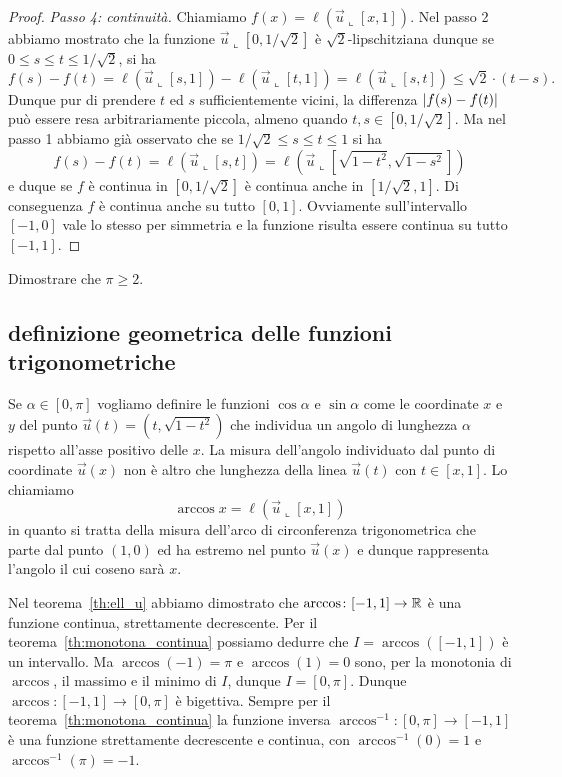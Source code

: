 \begin{proof}
  \emph{Passo 4: continuità.}
  Chiamiamo $f(x)= \ell(\vec u \llcorner[x,1])$.
  Nel passo 2 abbiamo mostrato che la funzione $\vec u \llcorner [0,1/\sqrt 2]$ 
  è $\sqrt 2$-lipschitziana dunque se $0\le s \le t \le 1/\sqrt 2$, si ha 
  \[
  f(s)-f(t) = \ell(\vec u\llcorner [s,1]) - \ell(\vec u\llcorner[t,1])
  = \ell(\vec u \llcorner[s,t]) 
  \le \sqrt 2\cdot (t-s).
  \]
  Dunque pur di prendere $t$ ed $s$ sufficientemente vicini, 
  la differenza ${\left|f(s)-f(t)\right|}$ può essere resa arbitrariamente piccola,
  almeno quando $t,s \in [0,1/\sqrt 2]$.
  Ma nel passo 1 abbiamo già osservato che se $1/\sqrt 2 \le s \le t \le 1$ 
  si ha 
  \[
  f(s)-f(t) 
  = \ell(\vec u \llcorner [s,t])
  = \ell(\vec u \llcorner [\sqrt{1-t^2},\sqrt{1-s^2}])  
  \]
  e duque se $f$ è continua in $[0,1/\sqrt 2]$ è continua 
  anche in $[1/\sqrt 2, 1]$. 
  Di conseguenza $f$ è continua anche su tutto $[0,1]$.
  Ovviamente sull'intervallo $[-1,0]$ vale lo stesso per simmetria
  e la funzione risulta essere continua su tutto $[-1,1]$.
\end{proof}

\begin{exercise}
Dimostrare che $\pi\ge 2$.
\end{exercise}

\subsection{definizione geometrica delle funzioni trigonometriche}
Se $\alpha\in [0,\pi]$
vogliamo definire le funzioni $\cos \alpha$ e $\sin \alpha$ come le coordinate $x$ 
e $y$ del punto $\vec u(t)=(t,\sqrt{1-t^2})$ che individua un angolo di lunghezza 
$\alpha$ rispetto all'asse positivo delle $x$.
La misura dell'angolo individuato dal punto di coordinate $\vec u(x)$ non è altro che
lunghezza della linea $\vec u(t)$ con $t\in[x,1]$. 
Lo chiamiamo
\[
  \arccos x = \ell(\vec u\llcorner [x,1])
\] 
in quanto si tratta della misura dell'arco di circonferenza trigonometrica che parte 
dal punto $(1,0)$ ed ha estremo nel punto $\vec u(x)$ e dunque rappresenta 
l'angolo il cui coseno sarà $x$.

Nel teorema~\ref{th:ell_u} abbiamo dimostrato che 
$\arccos\colon [-1,1]\to {\mathbb R}$ è una funzione 
continua, strettamente decrescente.
Per il teorema~\ref{th:monotona_continua}
possiamo dedurre che $I = \arccos([-1,1])$ è un intervallo.
Ma $\arccos(-1) = \pi$ e $\arccos(1)=0$ sono, 
per la monotonia di $\arccos$,
il massimo e il minimo di $I$, dunque $I=[0,\pi]$.
Dunque $\arccos\colon [-1,1]\to [0,\pi]$ è bigettiva.
Sempre per il teorema~\ref{th:monotona_continua}
la funzione inversa $\arccos^{-1}\colon [0,\pi]\to[-1,1]$
è una funzione strettamente decrescente e continua, 
con $\arccos^{-1}(0) = 1$ e $\arccos^{-1}(\pi)=-1$.

